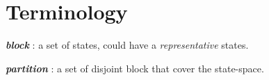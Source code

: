 \documentclass[a4paper,11pt]{article}
\author{Sylvain Julmy}
\newcommand*{\term}[1]{\textbf{\textit{#1}}}
\begin{document}
\section{Terminology}

\term{block} : a set of states, could have a \textit{representative}
states.

\term{partition} : a set of disjoint block that cover the state-space.
\end{document}
